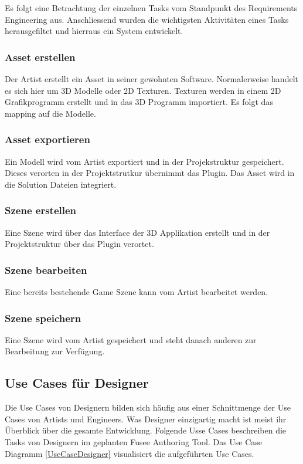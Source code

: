 \documentclass[pagesize, paper=a4, fontsize=12pt, titlepage=true, headings=small, headnosepline, abstractoff, liststotoc, nochapterprefix, plainheadsepline, twoside]{scrreprt}
\begin{document}
Es folgt eine Betrachtung der einzelnen Tasks vom Standpunkt des Requirements Engineering aus. Anschliessend wurden die wichtigsten Aktivitäten eines Tasks herausgefiltet und hierraus ein System entwickelt.

\subsubsection{Asset erstellen}
Der Artist erstellt ein Asset in seiner gewohnten Software. Normalerweise handelt es sich hier um 3D Modelle oder 2D Texturen. Texturen werden in einem 2D Grafikprogramm erstellt und  in das 3D Programm importiert. Es folgt das mapping auf die Modelle.

\subsubsection{Asset exportieren}
Ein Modell wird vom Artist exportiert und in der Projekstruktur gespeichert. Dieses verorten in der Projektstrutkur übernimmt das Plugin. Das Asset wird in die Solution Dateien integriert.

\subsubsection{Szene erstellen}
Eine Szene wird über das Interface der 3D Applikation erstellt und in der Projektstruktur über das Plugin verortet.

\subsubsection{Szene bearbeiten}
Eine bereits bestehende Game Szene kann vom Artist bearbeitet werden.

\subsubsection{Szene speichern}
Eine Szene wird vom Artist gespeichert und steht danach anderen zur Bearbeitung zur Verfügung.

\subsection{Use Cases für Designer}
Die Use Cases von Designern bilden sich häufig aus einer Schnittmenge der Use Cases von Artists und Engineers. Was Designer einzigartig macht ist meist ihr Überblick über die gesamte Entwicklung. Folgende Usse Cases beschreiben die Tasks von Designern im geplanten Fusee Authoring Tool. Das Use Case Diagramm \ref{UseCaseDesigner} visualisiert die aufgeführten Use Cases.
\end{document}
